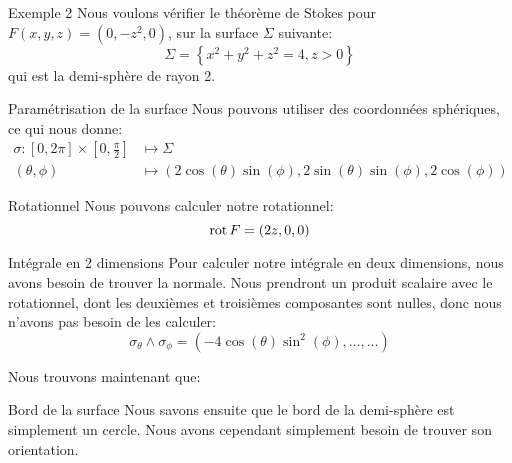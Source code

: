 \documentclass[a4paper]{article}
\begin{document}
\begin{parag}{Exemple 2}
    Nous voulons vérifier le théorème de Stokes pour $F\left(x, y, z\right) = \left(0, -z^2, 0\right)$, sur la surface $\Sigma$ suivante: 
    \[\Sigma = \left\{x^2 + y^2 + z^2 = 4, z > 0\right\}\]
    qui est la demi-sphère de rayon 2.
    
    \begin{subparag}{Paramétrisation de la surface}
        Nous pouvons utiliser des coordonnées sphériques, ce qui nous donne: 
        \[\begin{split}
        \sigma: \left[0, 2\pi\right] \times \left[0, \frac{\pi}{2}\right] &\longmapsto \Sigma \\
        \left(\theta, \phi\right) &\longmapsto \left(2\cos\left(\theta\right)\sin\left(\phi\right), 2\sin\left(\theta\right)\sin\left(\phi\right), 2\cos\left(\phi\right)\right)
        \end{split}\]
    \end{subparag}
    
    \begin{subparag}{Rotationnel}
        Nous pouvons calculer notre rotationnel: 
        \[\rot F = \left(2z, 0, 0\right)\]
    \end{subparag}

    \begin{subparag}{Intégrale en 2 dimensions}
        Pour calculer notre intégrale en deux dimensions, nous avons besoin de trouver la normale. Nous prendront un produit scalaire avec le rotationnel, dont les deuxièmes et troisièmes composantes sont nulles, donc nous n'avons pas besoin de les calculer: 
        \[\sigma_{\theta} \wedge \sigma_{\phi} = \left(-4\cos\left(\theta\right)\sin^2\left(\phi\right), \ldots, \ldots\right)\]
        
        Nous trouvons maintenant que: 
    \end{subparag}
    
    \begin{subparag}{Bord de la surface}
        Nous savons ensuite que le bord de la demi-sphère est simplement un cercle. Nous avons cependant simplement besoin de trouver son orientation.


\end{subparag}
\end{parag}
\end{document}
